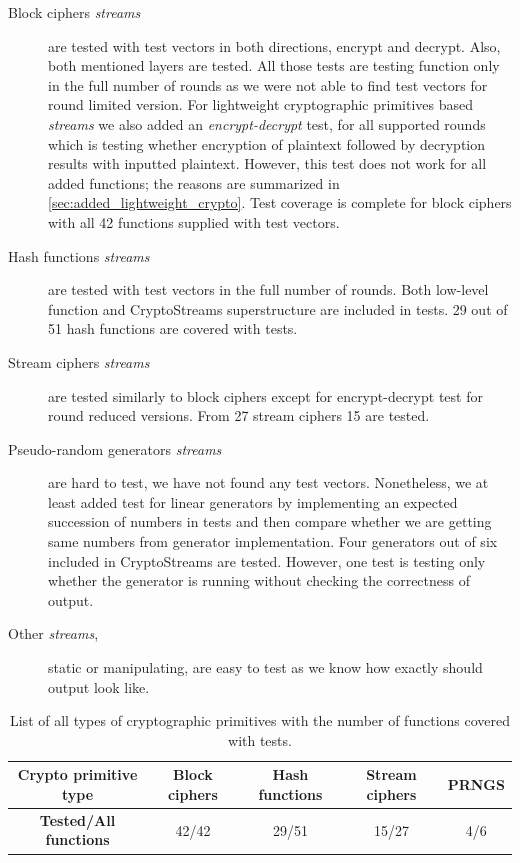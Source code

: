 \documentclass[
    digital,    %
    oneside,    %
    color,
    11pt,
    nocover,
    notable,
    nolof,
    nolot,
    final
]{fithesis3}
\renewcommand\_{\textunderscore\allowbreak}
\begin{document}
\begin{description}
	\item[Block ciphers \textit{streams}] are tested with test vectors in both directions, encrypt and decrypt. Also, both mentioned layers are tested. All those tests are testing function only in the full number of rounds as we were not able to find test vectors for round limited version. For lightweight cryptographic primitives based \textit{streams} we also added an \textit{encrypt-decrypt} test, for all supported rounds which is testing whether encryption of plaintext followed by decryption results with inputted plaintext. However, this test does not work for all added functions; the reasons are summarized in \cref{sec:added_lightweight_crypto}. Test coverage is complete for block ciphers with all 42 functions supplied with test vectors.
	
	\item[Hash functions \textit{streams}] are tested with test vectors in the full number of rounds. Both low-level function and CryptoStreams superstructure are included in tests. 29 out of 51 hash functions are covered with tests.
	
	\item[Stream ciphers \textit{streams}] are tested similarly to block ciphers except for encrypt-decrypt test for round reduced versions. From 27 stream ciphers 15 are tested.
	
	\item[Pseudo-random generators \textit{streams}] are hard to test, we have not found any test vectors. Nonetheless, we at least added test for linear generators by implementing an expected succession of numbers in tests and then compare whether we are getting same numbers from generator implementation. Four generators out of six included in CryptoStreams are tested. However, one test is testing only whether the generator is running without checking the correctness of output.
	
	\item[Other \textit{streams},] static or manipulating, are easy to test as we know how exactly should output look like.
	 
\end{description}
\begin{table}[t]
	\centering	
	\begin{tabular}{c|c c c c}
		\textbf{\large Crypto primitive type} &  Block ciphers &  Hash functions &  Stream ciphers &  PRNGS  \\ \hline
		\textbf{\large Tested/All functions} & 42/42	&	29/51		&		15/27	&		4/6	\\
		
	\end{tabular}
	\caption{List of all types of cryptographic primitives with the number of functions covered with tests.}
	\label{table:tested-cryptoprimitives}
\end{table}
\end{document}
